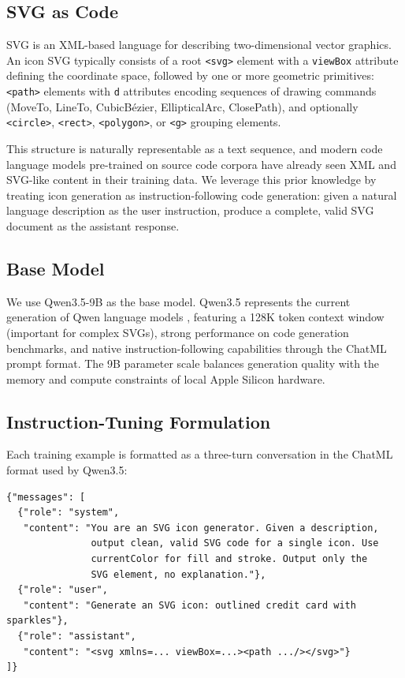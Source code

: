 
\subsection{SVG as Code}

SVG is an XML-based language for describing two-dimensional vector graphics.
An icon SVG typically consists of a root \texttt{<svg>} element with a
\texttt{viewBox} attribute defining the coordinate space, followed by one or
more geometric primitives: \texttt{<path>} elements with \texttt{d} attributes
encoding sequences of drawing commands (MoveTo, LineTo, CubicBézier,
EllipticalArc, ClosePath), and optionally \texttt{<circle>}, \texttt{<rect>},
\texttt{<polygon>}, or \texttt{<g>} grouping elements.

This structure is naturally representable as a text sequence, and modern code
language models pre-trained on source code corpora have already seen XML and
SVG-like content in their training data. We leverage this prior knowledge by
treating icon generation as instruction-following code generation: given a
natural language description as the user instruction, produce a complete,
valid SVG document as the assistant response.

\subsection{Base Model}

We use Qwen3.5-9B \citep{qwen3} as the base model. Qwen3.5 represents the
current generation of Qwen language models \citep{qwen25}, featuring a 128K
token context window (important for complex SVGs), strong performance on code
generation benchmarks, and native instruction-following capabilities through
the ChatML prompt format. The 9B parameter scale balances generation quality
with the memory and compute constraints of local Apple Silicon hardware.

\subsection{Instruction-Tuning Formulation}

Each training example is formatted as a three-turn conversation in the
ChatML format used by Qwen3.5:

\begin{lstlisting}[style=svgstyle, caption={Training record format (ChatML)}]
{"messages": [
  {"role": "system",
   "content": "You are an SVG icon generator. Given a description,
               output clean, valid SVG code for a single icon. Use
               currentColor for fill and stroke. Output only the
               SVG element, no explanation."},
  {"role": "user",
   "content": "Generate an SVG icon: outlined credit card with sparkles"},
  {"role": "assistant",
   "content": "<svg xmlns=... viewBox=...><path .../></svg>"}
]}
\end{lstlisting}


